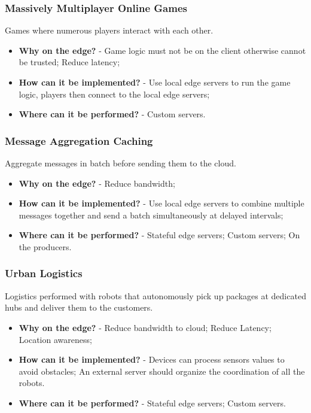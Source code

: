 \subsubsection{Massively Multiplayer Online Games}
Games where numerous players interact with each other.
\begin{itemize}
    \item \textbf{Why on the edge?} - Game logic must not be on the client otherwise cannot be trusted; Reduce latency;
    \item \textbf{How can it be implemented?} - Use local edge servers to run the game logic, players then connect to the local edge servers;
    \item \textbf{Where can it be performed?} - Custom servers.
\end{itemize}


\subsubsection{Message Aggregation Caching}
Aggregate messages in batch before sending them to the cloud.
\begin{itemize}
    \item \textbf{Why on the edge?} - Reduce bandwidth;
    \item \textbf{How can it be implemented?} - Use local edge servers to combine multiple messages together and send a batch simultaneously at delayed intervals;
    \item \textbf{Where can it be performed?} - Stateful edge servers; Custom servers; On the producers.
\end{itemize}


\subsubsection{Urban Logistics}
Logistics performed with robots that autonomously pick up packages at dedicated hubs and deliver them to the customers.
\begin{itemize}
    \item \textbf{Why on the edge?} - Reduce bandwidth to cloud; Reduce Latency; Location awareness;
    \item \textbf{How can it be implemented?} - Devices can process sensors values to avoid obstacles; An external server should organize the coordination of all the robots.
    \item \textbf{Where can it be performed?} - Stateful edge servers; Custom servers.
\end{itemize}


